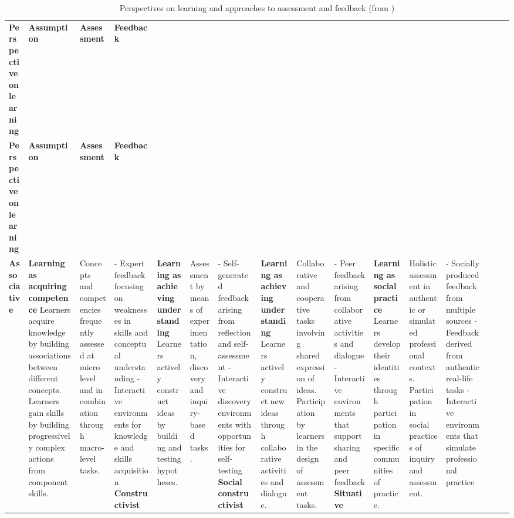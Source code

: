 \begin{longtable}{|L{0.188}|L{0.248}|L{0.204}|L{0.25}|}
	\caption[Perspectives on learning]{\label{Table: Perspectives on Learning} Perspectives on learning and approaches to assessment and feedback (from \citep{digiassess})} \\
	\hline \textbf{Perspective on learning} & \textbf{Assumption} & \textbf{Assessment} & \textbf{Feedback} \\ \hhline{|=|=|=|=|}
	\endfirsthead
	\hline \textbf{Perspective on learning} & \textbf{Assumption} & \textbf{Assessment} & \textbf{Feedback} \\ \hhline{|=|=|=|=|} \endhead
	 \endfoot
	\endlastfoot
	\textbf{Associative} & \textbf{Learning as acquiring competence} \newline Learners acquire knowledge by building associations between different concepts. \newline Learners gain skills by building progressively complex actions from component skills. & Concepts and competencies frequently assessed at micro level and in combination through macro-level tasks. & - Expert feedback focusing on weaknesses in skills and conceptual understanding \newline - Interactive environments for knowledge and skills acquisition \eoline
	\textbf{Constructivist} & \textbf{Learning as achieving understanding} \newline Learners actively construct ideas by building and testing hypotheses. & Assessment by means of experimentation, discovery and inquiry-based tasks. & - Self-generated feedback arising from reflection and self-assessment \newline -Interactive discovery environments with opportunities for self-testing \eoline
	\textbf{Social constructivist} & \textbf{Learning as achieving understanding} \newline Learners actively construct new ideas through collaborative activities and dialogue. & Collaborative and cooperative tasks involving shared expression of ideas. \newline Participation by learners in the design of assessment tasks. & - Peer feedback arising from collaborative activities and dialogue \newline -Interactive environments that support sharing and peer feedback \eoline
	\textbf{Situative} & \textbf{Learning as social practice} \newline Learners develop their identities through participation in specific communities of practice. & Holistic assessment in authentic or simulated professional contexts. \newline Participation in social practices of inquiry and assessment. & - Socially produced feedback from multiple sources \newline - Feedback derived from authentic real-life tasks \newline - Interactive environments that simulate professional practice \eoline
\end{longtable}

